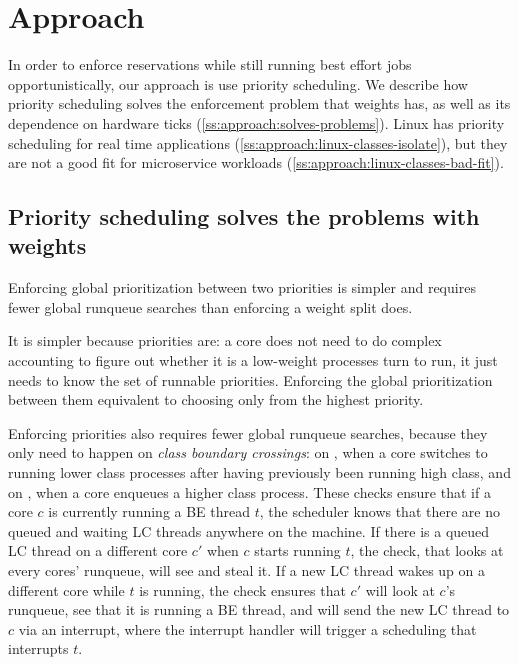\section{Approach}\label{s:approach}

In order to enforce reservations while still running best effort jobs
opportunistically, our approach is use priority scheduling. We describe how
priority scheduling solves the enforcement problem that weights has, as well as
its dependence on hardware ticks (\autoref{ss:approach:solves-problems}). Linux
has priority scheduling for real time applications
(\autoref{ss:approach:linux-classes-isolate}), but they are not a good fit for
microservice workloads (\autoref{ss:approach:linux-classes-bad-fit}).

\subsection{Priority scheduling solves the problems with
weights}\label{ss:approach:solves-problems}

Enforcing global prioritization between two priorities is simpler and requires
fewer global runqueue searches than enforcing a weight split does. 

It is simpler because priorities are: a core does not need to do complex
accounting to figure out whether it is a low-weight processes turn to run, it
just needs to know the set of runnable priorities. Enforcing the global
prioritization between them equivalent to choosing only from the highest
priority.

Enforcing priorities also requires fewer global runqueue searches, because they
only need to happen on \textit{class boundary crossings}: on \exit{}, when a
core switches to running lower class processes after having previously been
running high class, and on \entry{}, when a core enqueues a higher class
process. These checks ensure that if a core $c$ is currently running a BE thread
$t$, the scheduler knows that there are no queued and waiting LC threads
anywhere on the machine. If there is a queued LC thread on a different core $c'$
when $c$ starts running $t$, the \exit{} check, that looks at every cores'
runqueue, will see and steal it. If a new LC thread wakes up on a different core
while $t$ is running, the \entry{} check ensures that $c'$ will look at $c$'s
runqueue, see that it is running a BE thread, and will send the new LC thread to
$c$ via an interrupt, where the interrupt handler will trigger a scheduling that
interrupts $t$.

